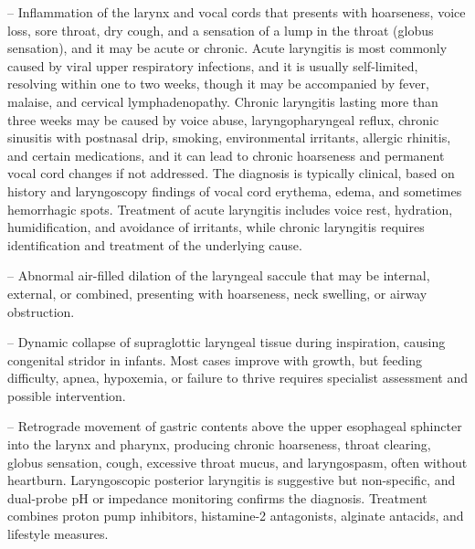 -- Inflammation of the larynx and vocal cords that presents with hoarseness, voice loss, sore throat, dry cough, and a sensation of a lump in the throat (globus sensation), and it may be acute or chronic. Acute laryngitis is most commonly caused by viral upper respiratory infections, and it is usually self-limited, resolving within one to two weeks, though it may be accompanied by fever, malaise, and cervical lymphadenopathy. Chronic laryngitis lasting more than three weeks may be caused by voice abuse, laryngopharyngeal reflux, chronic sinusitis with postnasal drip, smoking, environmental irritants, allergic rhinitis, and certain medications, and it can lead to chronic hoarseness and permanent vocal cord changes if not addressed. The diagnosis is typically clinical, based on history and laryngoscopy findings of vocal cord erythema, edema, and sometimes hemorrhagic spots. Treatment of acute laryngitis includes voice rest, hydration, humidification, and avoidance of irritants, while chronic laryngitis requires identification and treatment of the underlying cause.

-- Abnormal air-filled dilation of the laryngeal saccule that may be internal, external, or combined, presenting with hoarseness, neck swelling, or airway obstruction.

-- Dynamic collapse of supraglottic laryngeal tissue during inspiration, causing congenital stridor in infants. Most cases improve with growth, but feeding difficulty, apnea, hypoxemia, or failure to thrive requires specialist assessment and possible intervention.

-- Retrograde movement of gastric contents above the upper esophageal sphincter into the larynx and pharynx, producing chronic hoarseness, throat clearing, globus sensation, cough, excessive throat mucus, and laryngospasm, often without heartburn. Laryngoscopic posterior laryngitis is suggestive but non-specific, and dual-probe pH or impedance monitoring confirms the diagnosis. Treatment combines proton pump inhibitors, histamine-2 antagonists, alginate antacids, and lifestyle measures.

